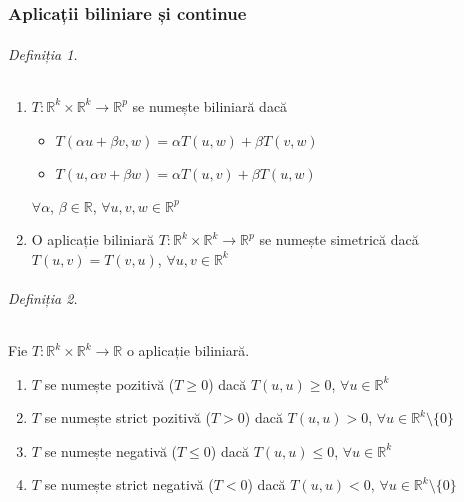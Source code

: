 \part{}
\section{Aplicații biliniare și continue}

\paragraph{Definiția 1.}
\begin{enumerate}[label=\emph{\alph*})]
    \item $T: \mathbb{R}^{k} \times \mathbb{R}^{k} \rightarrow \mathbb{R}^{p}$ se numește biliniară dacă
        \begin{itemize}
            \item $T(\alpha u+\beta v, w) = \alpha T(u,w) + \beta T(v,w)$
            \item $T(u, \alpha v+\beta w) = \alpha T(u,v) + \beta T(u,w)$
        \end{itemize}
        $\forall \alpha$, $\beta \in \mathbb{R}$, $\forall u, v, w \in \mathbb{R}^{p}$
    \item O aplicație biliniară $T:\mathbb{R}^{k} \times \mathbb{R}^{k} \rightarrow \mathbb{R}^{p}$ se numește simetrică dacă
        $T(u,v) = T(v,u)$, $\forall u, v \in \mathbb{R}^{k}$
\end{enumerate}

\paragraph{Definiția 2.}
Fie $T:\mathbb{R}^{k} \times \mathbb{R}^{k} \rightarrow \mathbb{R}$ o aplicație biliniară.

\begin{enumerate}[label=\emph{\alph*})]
    \item $T$ se numește pozitivă ($T \geq 0$) dacă $T(u,u) \geq 0$, $\forall u \in \mathbb{R}^{k}$
    \item $T$ se numește strict pozitivă ($T > 0$) dacă $T(u,u) > 0$, $\forall u \in \mathbb{R}^{k} \setminus \{0\}$
    \item $T$ se numește negativă ($T \leq 0$) dacă $T(u,u) \leq 0$, $\forall u \in \mathbb{R}^{k}$
    \item $T$ se numește strict negativă ($T < 0$) dacă $T(u,u) < 0$, $\forall u \in \mathbb{R}^{k} \setminus \{0\}$
\end{enumerate}


